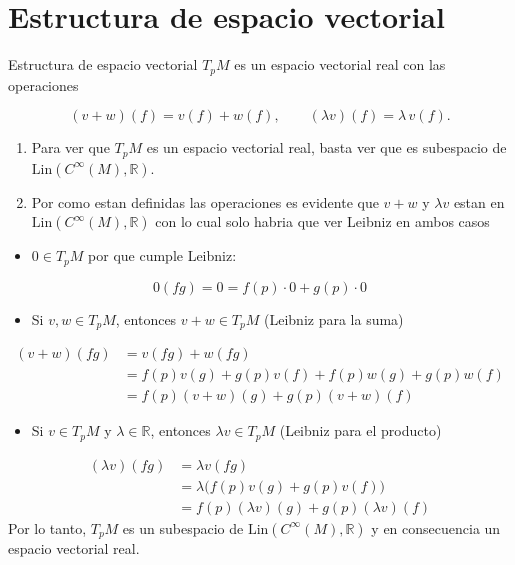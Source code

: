 \section{Estructura de espacio vectorial}
\begin{bookproposition}{Estructura de espacio vectorial}
$T_pM$ es un espacio vectorial real con las operaciones

\[
(v+w)(f)=v(f)+w(f),\qquad (\lambda v)(f)=\lambda\,v(f).
\]
\end{bookproposition}
\begin{bookproof}{}
\begin{enumerate}
\item Para ver que $T_pM$ es un espacio vectorial real, basta ver que es subespacio de $\mathrm{Lin}(C^\infty(M),\mathbb{R})$.
\item Por como estan definidas las operaciones es evidente que $v+w$ y $\lambda v$ estan en $\mathrm{Lin}(C^\infty(M),\mathbb{R})$ con lo cual solo habria que ver Leibniz en ambos casos
\end{enumerate}
\begin{itemize}
\item $0\in T_pM$ por que cumple Leibniz:
\end{itemize}
\[
0(fg)=0=f(p)\cdot0+g(p)\cdot0
\]
\begin{itemize}
\item Si $v,w\in T_pM$, entonces $v+w\in T_pM$ (Leibniz para la suma)
\end{itemize}
\[
\begin{aligned}(v+w)(fg)&=v(fg)+w(fg)\\&=f(p)v(g)+g(p)v(f)+f(p)w(g)+g(p)w(f)\\&=f(p)(v+w)(g)+g(p)(v+w)(f)\end{aligned}
\]
\begin{itemize}
\item Si $v\in T_pM$ y $\lambda\in\mathbb{R}$, entonces $\lambda v\in T_pM$ (Leibniz para el producto)
\end{itemize}
\[
\begin{aligned}(\lambda v)(fg)&=\lambda v(fg)\\&=\lambda\big(f(p)v(g)+g(p)v(f)\big)\\&=f(p)(\lambda v)(g)+g(p)(\lambda v)(f)\end{aligned}
\]
Por lo tanto, $T_pM$ es un subespacio de $\mathrm{Lin}(C^\infty(M),\mathbb{R})$ y en consecuencia un espacio vectorial real.

\bookqed
\end{bookproof}
